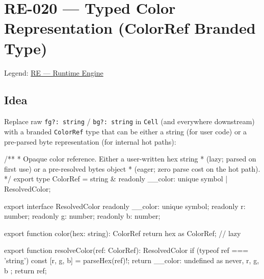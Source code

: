 \chapter{RE-020 --- Typed Color Representation (ColorRef Branded Type)}\label{record-370}

\smallskip

Legend: \href{https://github.com/flyingrobots/bijou/blob/cbd70612140e7a450d764b3c7be1c6af878b99bc/docs/method/graveyard/legends/RE-runtime-engine.md}{RE --- Runtime Engine}

\section{Idea}\label{record-370-idea}

Replace raw \texttt{f\allowbreak{}g\allowbreak{}?\allowbreak{}:\allowbreak{} \allowbreak{}s\allowbreak{}t\allowbreak{}r\allowbreak{}i\allowbreak{}n\allowbreak{}g} / \texttt{b\allowbreak{}g\allowbreak{}?\allowbreak{}:\allowbreak{} \allowbreak{}s\allowbreak{}t\allowbreak{}r\allowbreak{}i\allowbreak{}n\allowbreak{}g} in \texttt{C\allowbreak{}e\allowbreak{}l\allowbreak{}l} (and everywhere downstream) with a branded \texttt{C\allowbreak{}o\allowbreak{}l\allowbreak{}o\allowbreak{}r\allowbreak{}R\allowbreak{}e\allowbreak{}f} type that can be either a string (for user code) or a pre-parsed byte representation (for internal hot paths):

\begin{CodeBlock}
/**
 * Opaque color reference. Either a user-written hex string
 * (lazy; parsed on first use) or a pre-resolved bytes object
 * (eager; zero parse cost on the hot path).
 */
export type ColorRef = string & { readonly __color: unique symbol }
                     | ResolvedColor;

export interface ResolvedColor {
  readonly __color: unique symbol;
  readonly r: number;
  readonly g: number;
  readonly b: number;
}

export function color(hex: string): ColorRef {
  return hex as ColorRef;  // lazy
}

export function resolveColor(ref: ColorRef): ResolvedColor {
  if (typeof ref === 'string') {
    const [r, g, b] = parseHex(ref)!;
    return { __color: undefined as never, r, g, b };
  }
  return ref;
}
\end{CodeBlock}


